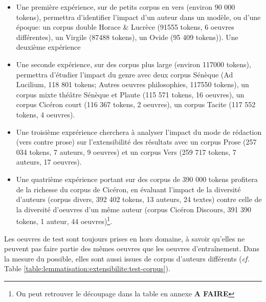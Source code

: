 \begin{itemize}
    \item Une première expérience, sur de petits corpus en vers (environ 90 000 tokens), permettra d'identifier l'impact d'un auteur dans un modèle, ou d'une époque: un corpus double Horace \& Lucrèce (91555 tokens, 6 oeuvres différentes), un Virgile (87488 tokens), un Ovide (95 409 tokens)). Une deuxième expérience
    \item Une seconde expérience, sur des corpus plus large (environ 117000 tokens), permettra d'étudier l'impact du genre avec deux corpus Sénèque (Ad Lucilium, 118 801 tokens; Autres oeuvres philosophies, 117550 tokens), un corpus mixte théâtre Sénèque et Plaute (115 571 tokens, 16 oeuvres), un corpus Cicéron court (116 367 tokens, 2 oeuvres), un corpus Tacite (117 552 tokens, 4 oeuvres).
    \item Une troisième exprérience cherchera à analyser l'impact du mode de rédaction (vers contre prose) sur l'extensibilité des résultats avec un corpus Prose (257 034 tokens, 7 auteurs, 9 oeuvres) et un corpus Vers (259 717 tokens, 7 auteurs, 17 oeuvres).
    \item Une quatrième expérience portant sur des corpus de 390 000 tokens profitera de la richesse du corpus de Cicéron, en évaluant l'impact de la diversité d'auteurs (corpus divers, 392 402 tokens, 13 auteurs, 24 textes) contre celle de la diversité d'oeuvres d'un même auteur (corpus Cicéron Discours, 391 390 tokens, 1 auteur, 44 oeuvres)\footnote{On peut retrouver le découpage dans la table en annexe \textbf{A FAIRE}}.
\end{itemize}{}

Les oeuvres de test sont toujours prises en hors domaine, à savoir qu'elles ne peuvent pas faire partie des mêmes oeuvres que les oeuvres d'entraînement. Dans la mesure du possible, elles sont aussi issues de corpus d'auteurs différents (\textit{cf.} Table \ref{table:lemmatisation:extensibilite:test-corpus}).

